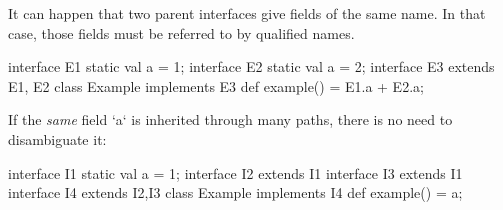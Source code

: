It can happen that two parent interfaces give fields of the same name.  In
that case, those fields must be referred to by qualified names.
% 
\begin{xten}
interface E1 {static val a = 1;}
interface E2 {static val a = 2;}
interface E3 extends E1, E2{}
class Example implements E3 {
  def example() = E1.a + E2.a;
}
\end{xten}
%

If the {\em same} field \xcd`a` is inherited through many paths, there is no need to
disambiguate it:
\begin{xten}
interface I1 { static val a = 1;} 
interface I2 extends I1 {}
interface I3 extends I1 {}
interface I4 extends I2,I3 {}
class Example implements I4 {
  def example() = a;
}
\end{xten}
%



